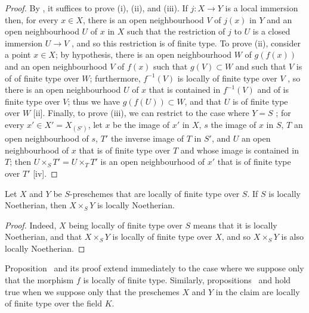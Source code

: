 \begin{proof}
By , it suffices to prove (i), (ii), and (iii).
If $j:X\to Y$ is a local immersion then, for every $x\in X$, there is an open neighbourhood $V$ of $j(x)$ in $Y$ and an open neighbourhood $U$ of $x$ in $X$ such that the restriction of $j$ to $U$ is a closed immersion $U\to V$ , and so this restriction is of finite type.
To prove (ii), consider a point $x\in X$;
by hypothesis, there is an open neighbourhood $W$ of $g(f(x))$ and an open neighbourhood $V$ of $f(x)$ such that $g(V)\subset W$ and such that $V$ is of of finite type over $W$;
furthermore, $f^{-1}(V)$ is locally of finite type over $V$ , so there is an open neighbourhood $U$ of $x$ that is contained in $f^{-1}(V)$ and of is finite type over $V$;
thus we have $g(f(U))\subset W$, and that $U$ is of finite type over $W$ [ii].
Finally, to prove (iii), we can restrict to the case where $Y=S$ ;
for every $x'\in X'=X_{(S')}$, let $x$ be the image of $x'$ in $X$, $s$ the image of $x$ in $S$, $T$ an open neighbourhood of $s$, $T'$ the inverse image of $T$ in $S'$, and $U$ an open neighbourhood of $x$ that is of finite type over $T$ and whose image is contained in $T$;
then $U\times_S T'=U\times_T T'$ is an open neighbourhood of $x'$  that is of finite type over $T'$ [iv].
\end{proof}

\begin{corollary}[6.6.7]
\label{I.6.6.7}
Let $X$ and $Y$ be $S$-preschemes that are locally of finite type over $S$.
If $S$ is locally Noetherian, then $X\times_S Y$ is locally Noetherian.
\end{corollary}

\begin{proof}
Indeed, $X$ being locally of finite type over $S$ means that it is locally Noetherian, and that $X\times_S Y$ is locally of finite type over $X$, and so $X\times_S Y$ is also locally Noetherian.
\end{proof}

\begin{remark}[6.6.8]
\label{I.6.6.8}
Proposition~ and its proof extend immediately to the case where we suppose only that the morphism $f$ is locally of finite type.
Similarly, propositions~ and  hold true when we suppose only that the preschemes $X$ and $Y$ in the claim are locally of finite type over the field $K$.
\end{remark}

